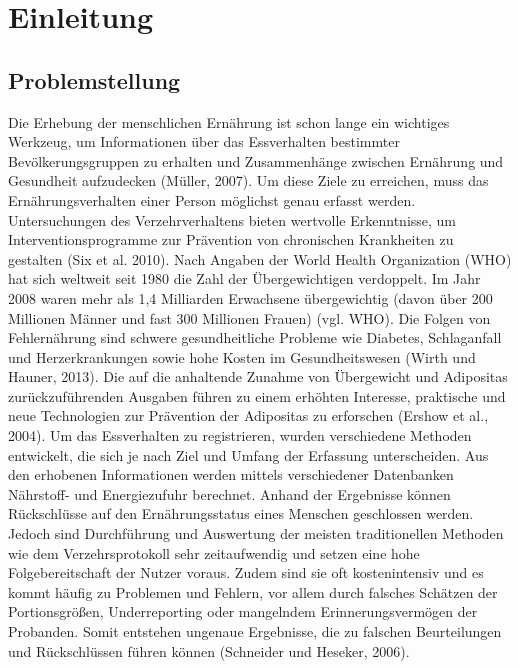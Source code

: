
\section{Einleitung}

\subsection{Problemstellung}
Die Erhebung der menschlichen  Ernährung ist schon lange ein wichtiges Werkzeug, um Informationen über das Essverhalten bestimmter Bevölkerungsgruppen zu erhalten und Zusammenhänge zwischen Ernährung und Gesundheit aufzudecken (Müller, 2007).
Um diese Ziele zu erreichen, muss das Ernährungsverhalten einer Person möglichst genau erfasst werden. Untersuchungen des Verzehrverhaltens bieten wertvolle Erkenntnisse, um Interventionsprogramme zur Prävention von chronischen Krankheiten zu gestalten (Six et al. 2010). Nach  Angaben der World Health Organization (WHO) hat sich weltweit seit 1980 die Zahl der Übergewichtigen verdoppelt. Im Jahr 2008 waren mehr als 1,4 Milliarden Erwachsene übergewichtig (davon über 200 Millionen Männer und fast 300 Millionen Frauen) (vgl. WHO). Die Folgen von Fehlernährung sind schwere gesundheitliche Probleme wie Diabetes, Schlaganfall und Herzerkrankungen sowie hohe Kosten im Gesundheitswesen (Wirth und Hauner, 2013). Die auf die anhaltende Zunahme von Übergewicht und Adipositas zurückzuführenden Ausgaben führen zu einem erhöhten Interesse, praktische und neue Technologien zur Prävention der Adipositas zu erforschen (Ershow et al., 2004). Um das Essverhalten zu registrieren, wurden verschiedene Methoden entwickelt, die sich je nach Ziel und Umfang der Erfassung unterscheiden. Aus den erhobenen Informationen werden mittels verschiedener Datenbanken Nährstoff- und Energiezufuhr berechnet. Anhand der Ergebnisse können Rückschlüsse auf den Ernährungsstatus eines Menschen geschlossen werden. Jedoch sind Durchführung und Auswertung der meisten traditionellen Methoden wie dem Verzehrsprotokoll sehr zeitaufwendig und setzen eine hohe Folgebereitschaft der Nutzer voraus. Zudem sind sie oft kostenintensiv und es kommt häufig zu Problemen und Fehlern, vor allem durch falsches Schätzen der Portionsgrößen, Underreporting oder mangelndem Erinnerungsvermögen der Probanden. Somit entstehen ungenaue Ergebnisse, die zu falschen Beurteilungen und Rückschlüssen führen können (Schneider und Heseker, 2006).


